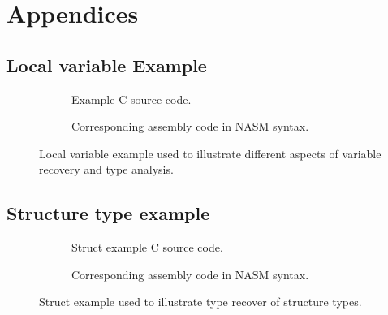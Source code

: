 
\onecolumn

\appendix
\setcounter{secnumdepth}{0}
\section{Appendices}
\setcounter{secnumdepth}{3}
\renewcommand{\thesubsection}{\Alph{subsection}}


\subsection{Local variable Example}
\label{app:local_variable_example}

\begin{figure}[htbp]
	\centering
	\begin{subfigure}[ht]{0.3\textwidth}
		\centering
		
		\caption{Example C source code.}
		\label{fig:local_variable_example_c}
	\end{subfigure}
	\qquad
	\begin{subfigure}[ht]{0.65\textwidth}
		\centering
		
		\caption{Corresponding assembly code in NASM syntax.}
		\label{fig:local_variable_example_asm}
	\end{subfigure}
	\caption{Local variable example used to illustrate different aspects of variable recovery and type analysis.}
	\label{fig:local_variable_example}
\end{figure}

\clearpage

\subsection{Structure type example}
\label{app:struct_example}

\begin{figure}[htbp]
	\centering
	\begin{subfigure}[ht]{0.3\textwidth}
		\centering
		
		\caption{Struct example C source code.}
		\label{fig:struct_example_c}
	\end{subfigure}
	\qquad
	\begin{subfigure}[ht]{0.65\textwidth}
		\centering
		
		\caption{Corresponding assembly code in NASM syntax.}
		\label{fig:struct_example_asm}
	\end{subfigure}
	\caption{Struct example used to illustrate type recover of structure types.}
	\label{fig:struct_example}
\end{figure}
